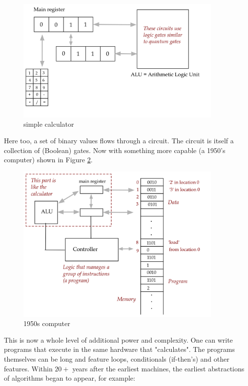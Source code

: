 \documentclass[main.tex]{subfiles}
\begin{document}
    \begin{figure}
        \centering
        \includegraphics[width=4in]{notes/figs/n08/02calculator.png}
        \caption{simple calculator}
        \label{fig:02calculator}
    \end{figure}
    
    Here too, a set of binary values flows through a circuit. The circuit is itself a collection of (Boolean) gates. Now with something more capable (a 1950's computer) shown in Figure \ref{fig:03program}.
    
    \begin{figure}
        \centering
        \includegraphics[width=4in]{notes/figs/n08/03program.png}
        \caption{1950s computer}
        \label{fig:03program}
    \end{figure}
    
    This is now a whole level of additional power and complexity. One can write programs that execute in the same hardware that "calculates". The programs themselves can be long and feature loops, conditionals (if-then's) and other features. Within $20+$ years after the earliest machines, the earliest abstractions of algorithms began to appear, for example:
    
\end{document}
